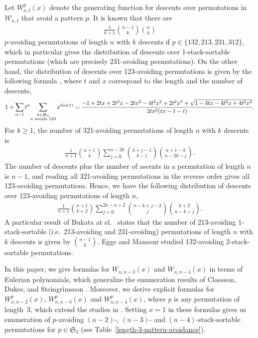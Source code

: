 \documentclass[11pt]{article}
\newcommand{\sortable}[2]{\ensuremath{\mathcal{W}_{#1,#2}}}
\newcommand{\+}{\mbox{\ensuremath{\scriptstyle{+}}}}
\DeclareMathOperator{\des}{des}
\begin{document}
Let $W_{n,t}^{p}(x)$ denote the generating function for descents over permutations in  $\sortable{n}{t}$ that avoid a pattern $p$. It is known \cite{BKLPRW} that there are
\begin{align}\label{1-st-sort-132}
	\frac{1}{k+1}{n-1\choose k}{n\choose k}
\end{align}
$p$-avoiding permutations of length $n$ with $k$ descents if $p\in\{132, 213, 231, 312\}$, which in particular gives the distribution of descents over 1-stack-sortable permutations (which are precisely 231-avoiding permutations). On the other hand, the distribution of descents over 123-avoiding permutations is given by the following formula \cite{BBS2010,BKLPRW}, where $t$ and $x$ correspond to the length and the number of descents,
\begin{align}
	1+ \sum_{n=1} t^n {\sum_{\substack{\pi\in\mathfrak S_n\\ \pi\text{ avoids }123}}x^{\des(\pi)}} = \frac{-1+2tx+2t^2x-2tx^2-4t^2x^2+2t^2x^3+\sqrt{1-4tx-4t^2x+4t^2x^2}}{2tx^2(tx-1-t)}. \notag
\end{align}
For $k\geq1$, the number of 321-avoiding permutations of length $n$ with $k$ descents \cite[A091156]{oeis} is
\begin{align}\label{321-des}
	\frac{1}{n+1}{n+1\choose k}\sum_{j=0}^{n-2k}{k+j-1\choose k-1}{n+1-k \choose n-2k-j}.
\end{align}
The number of descents plus the number of ascents in a permutation of length $n$ is $n-1$, and reading all 321-avoiding permutations in the reverse order gives all 123-avoiding permutations. Hence, we have the following distribution of descents over 123-avoiding permutations of length $n$,
\begin{align}\label{123-des}
	\frac{1}{n+1}{n+1\choose k+2}\sum_{j=0}^{2k-n+2}{n-k+j-2\choose j}{k+2 \choose n-k+j}.
\end{align}
A particular result of Bukata at el.~\cite{BKLPRW} states that the number of 213-avoiding 1-stack-sortable (i.e.\ 213-avoiding and 231-avoiding) permutations of length $n$ with $k$ descents is given by ${n-1\choose k}$. Egge and Mansour \cite{EggeMansour} studied 132-avoiding 2-stack-sortable permutations.

In this paper, we  give formulas for  $W_{n,n-3}(x)$ and $W_{n,n-4}(x)$ in terms of  Eulerian polynomials, which generalize the enumeration results of Claesson,  Dukes, and Steingr\'\i msson \cite{Claesson2010Permutations}. Moreover, we derive explicit formulas for  $W^{p}_{n,n-2}(x)$, $W^{p}_{n,n-3}(x)$ and $W^{p}_{n,n-4}(x)$, where $p$ is any permutation of length~3, which extend the studies in \cite{BBS2010,BKLPRW,EggeMansour}. Setting $x=1$ in these formulas gives us enumeration of $p$-avoiding $(n-2)$-, $(n-3)$- and $(n-4)$-stack-sortable permutations for $p\in\mathfrak{S}_3$ (see Table~\ref{length-3-pattern-avoidance}).
\end{document}
